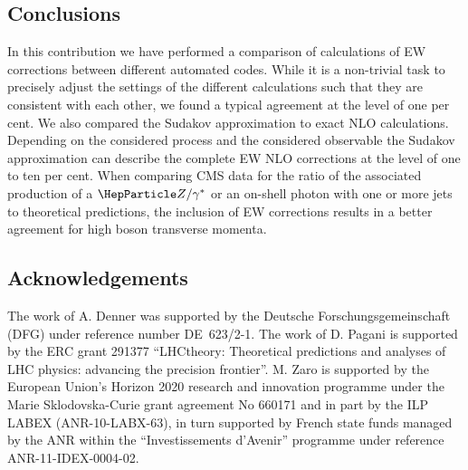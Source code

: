 \documentclass[11pt]{cernrep}
\begin{document}
\subsection{Conclusions}
In this contribution we have performed a comparison of calculations of
EW corrections between different automated codes. While it is
a non-trivial task to precisely adjust the settings of the different
calculations such that they are consistent with each other,  we found a
typical agreement at the level of one per cent. We also compared the
Sudakov approximation to exact NLO calculations. Depending on the
considered process and the considered observable the Sudakov
approximation can describe the complete EW NLO corrections at the
level of one to ten per cent.
%
When comparing CMS data for the ratio of the associated production of a
$\PZ/\gamma^*$ or an on-shell photon with one or more jets to theoretical
predictions, the inclusion of EW corrections results in a better
agreement for high boson transverse momenta. 



\subsection*{Acknowledgements}
The work of A. Denner was supported by the Deutsche Forschungsgemeinschaft
(DFG) under reference number DE~623/2-1. 
%
The work of D. Pagani is supported  by the ERC grant 291377 ``LHCtheory: Theoretical predictions and analyses of LHC physics:
advancing the precision frontier''.
%
M. Zaro is supported by the European Union's Horizon 2020 research and
innovation programme under the Marie Sklodovska-Curie grant agreement
No 660171 and in part by the ILP LABEX (ANR-10-LABX-63), in turn
supported by French state funds managed by the ANR within the ``Investissements d'Avenir'' programme under reference
ANR-11-IDEX-0004-02.



\end{document}

